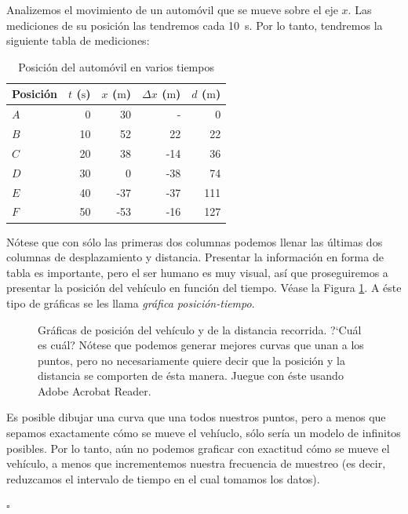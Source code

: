 \begin{ejemplo}\label{ej:carro2}
Analizemos el movimiento de un autom\'ovil que se mueve sobre el eje $x$. Las mediciones de su posici\'on las tendremos cada \SI{10}{\second}. Por lo tanto, tendremos la siguiente tabla de mediciones:

\begin{table}[ht]
\caption{Posici\'on del autom\'ovil en varios tiempos}
\begin{tabular}{l rrrr}
\toprule
\textbf{Posici\'on}  & \textbf{$t$ ($\si{\second}$)} & \textbf{$x$ ($\si{\meter}$)} & \textbf{$\Delta x$ ($\si{\meter}$)} & \textbf{$d$ ($\si{\meter}$)}\\
\midrule
$A$ & 0 & 30 & \-- & 0\\
$B$ & 10 & 52 & 22 & 22\\
$C$ & 20 & 38 & -14 & 36\\
$D$ & 30 & 0 & -38 & 74\\
$E$ & 40 & -37 & -37 & 111\\
$F$ & 50 & -53 & -16 & 127\\
\bottomrule
\end{tabular}
\label{table:carro1d2}
\end{table}

N\'otese que con s\'olo las primeras dos columnas podemos llenar las \'ultimas dos columnas de desplazamiento y distancia. Presentar la informaci\'on en forma de tabla es importante, pero el ser humano es muy visual, as\'i que proseguiremos a presentar la posici\'on del veh\'iculo en funci\'on del tiempo. V\'ease la Figura \ref{fig:posdist2}. A \'este tipo de gr\'aficas se les llama \emph{gr\'afica posici\'on-tiempo}.

\begin{figure}[ht]
    \centering
    \caption{Gr\'aficas de posici\'on del veh\'iculo y de la distancia recorrida. ?`Cu\'al es cu\'al? N\'otese que podemos generar mejores curvas que unan a los puntos, pero no necesariamente quiere decir que la posici\'on y la distancia se comporten de \'esta manera. Juegue con \'este usando Adobe Acrobat Reader.}
    \label{fig:posdist2}
\end{figure}

Es posible dibujar una curva que una todos nuestros puntos, pero a menos que sepamos exactamente c\'omo se mueve el veh\'iuclo, s\'olo ser\'ia un modelo de infinitos posibles. Por lo tanto, a\'un no podemos graficar con exactitud c\'omo se mueve el veh\'iculo, a menos que incrementemos nuestra frecuencia de muestreo (es decir, reduzcamos el intervalo de tiempo en el cual tomamos los datos).

\hfill $\square$
\end{ejemplo}

